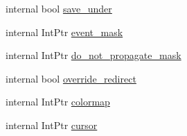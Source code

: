 \begin{DoxyCompactItemize}
internal bool \hyperlink{struct_tao_1_1_platform_1_1_x11_1_1_x_set_window_attributes_a9d8452c295e04658ee6a00c675f1c431}{save\_\-under}
\item 
internal IntPtr \hyperlink{struct_tao_1_1_platform_1_1_x11_1_1_x_set_window_attributes_ae4d18535198ab2e7b4b5b8d2adcce479}{event\_\-mask}
\item 
internal IntPtr \hyperlink{struct_tao_1_1_platform_1_1_x11_1_1_x_set_window_attributes_ae681eb9c5a7ef436282cdf93da4953b1}{do\_\-not\_\-propagate\_\-mask}
\item 
internal bool \hyperlink{struct_tao_1_1_platform_1_1_x11_1_1_x_set_window_attributes_adbe1a612324ad7c7cf6dfb668b582094}{override\_\-redirect}
\item 
internal IntPtr \hyperlink{struct_tao_1_1_platform_1_1_x11_1_1_x_set_window_attributes_a4cea078b5778b8b216022e25efc9587c}{colormap}
\item 
internal IntPtr \hyperlink{struct_tao_1_1_platform_1_1_x11_1_1_x_set_window_attributes_a641bfa0f6274c46a0893f2f4442d5e8d}{cursor}
\end{DoxyCompactItemize}


